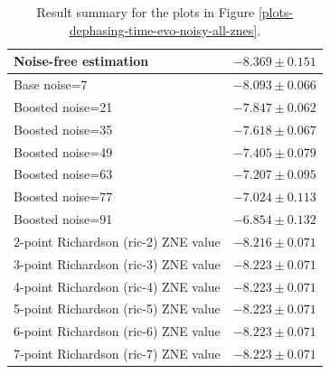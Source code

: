 \begin{table}
\caption{Result summary for the plots in Figure \ref{plots-dephasing-time-evo-noisy-all-znes}.}
\begin{tabular*}{\textwidth}{@{\extracolsep{\fill}}ll@{}}
\toprule

Noise-free estimation & $-8.369 \pm 0.151$ \\
\midrule
Base noise=7 & $-8.093 \pm 0.066$ \\
Boosted noise=21 & $-7.847 \pm 0.062$ \\
Boosted noise=35 & $-7.618 \pm 0.067$ \\
Boosted noise=49 & $-7.405 \pm 0.079$ \\
Boosted noise=63 & $-7.207 \pm 0.095$ \\
Boosted noise=77 & $-7.024 \pm 0.113$ \\
Boosted noise=91 & $-6.854 \pm 0.132$ \\
\midrule
2-point Richardson (ric-2) ZNE value & $-8.216 \pm 0.071$ \\
3-point Richardson (ric-3) ZNE value & $-8.223 \pm 0.071$ \\
4-point Richardson (ric-4) ZNE value & $-8.223 \pm 0.071$ \\
5-point Richardson (ric-5) ZNE value & $-8.223 \pm 0.071$ \\
6-point Richardson (ric-6) ZNE value & $-8.223 \pm 0.071$ \\
7-point Richardson (ric-7) ZNE value & $-8.223 \pm 0.071$ \\
\bottomrule
\end{tabular*}
\label{table-dephasing-noise-free-time-evo}
\end{table}
